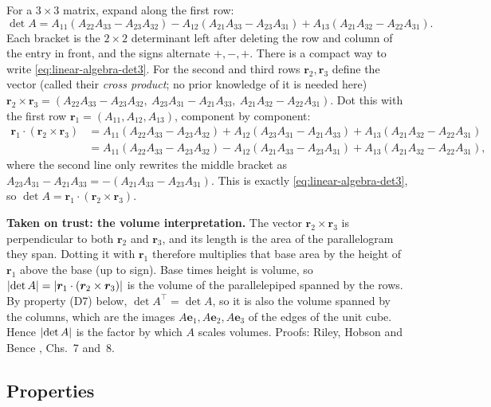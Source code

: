 For a $3\times3$ matrix, expand along the first row:
\begin{equation}
\det A=A_{11}(A_{22}A_{33}-A_{23}A_{32})-A_{12}(A_{21}A_{33}-A_{23}A_{31})+A_{13}(A_{21}A_{32}-A_{22}A_{31}).
\label{eq:linear-algebra-det3}
\end{equation}
Each bracket is the $2\times2$ determinant left after deleting the row and column of the entry in front, and the signs alternate $+,-,+$. There is a compact way to write \cref{eq:linear-algebra-det3}. For the second and third rows $\bm r_2,\bm r_3$ define the vector (called their \emph{cross product}; no prior knowledge of it is needed here) $\bm r_2\times\bm r_3=(A_{22}A_{33}-A_{23}A_{32},\ A_{23}A_{31}-A_{21}A_{33},\ A_{21}A_{32}-A_{22}A_{31})$. Dot this with the first row $\bm r_1=(A_{11},A_{12},A_{13})$, component by component:
\begin{align*}
\bm r_1\cdot(\bm r_2\times\bm r_3)&=A_{11}(A_{22}A_{33}-A_{23}A_{32})+A_{12}(A_{23}A_{31}-A_{21}A_{33})+A_{13}(A_{21}A_{32}-A_{22}A_{31})\\
&=A_{11}(A_{22}A_{33}-A_{23}A_{32})-A_{12}(A_{21}A_{33}-A_{23}A_{31})+A_{13}(A_{21}A_{32}-A_{22}A_{31}),
\end{align*}
where the second line only rewrites the middle bracket as $A_{23}A_{31}-A_{21}A_{33}=-(A_{21}A_{33}-A_{23}A_{31})$. This is exactly \cref{eq:linear-algebra-det3}, so $\det A=\bm r_1\cdot(\bm r_2\times\bm r_3)$. \begin{beyond}
\textbf{Taken on trust: the volume interpretation.} The vector $\bm r_2\times\bm r_3$ is perpendicular to both $\bm r_2$ and $\bm r_3$, and its length is the area of the parallelogram they span. Dotting it with $\bm r_1$ therefore multiplies that base area by the height of $\bm r_1$ above the base (up to sign). Base times height is volume, so $\left\lvert \det A\right\rvert=\left\lvert \bm r_1\cdot(\bm r_2\times\bm r_3)\right\rvert$ is the volume of the parallelepiped spanned by the rows. By property (D7) below, $\det A^\top=\det A$, so it is also the volume spanned by the columns, which are the images $A\bm e_1,A\bm e_2,A\bm e_3$ of the edges of the unit cube. Hence $\left\lvert \det A\right\rvert$ is the factor by which $A$ scales volumes. Proofs: Riley, Hobson and Bence \cite{rhb}, Chs.~7 and~8.
\end{beyond}

\subsection{Properties}

